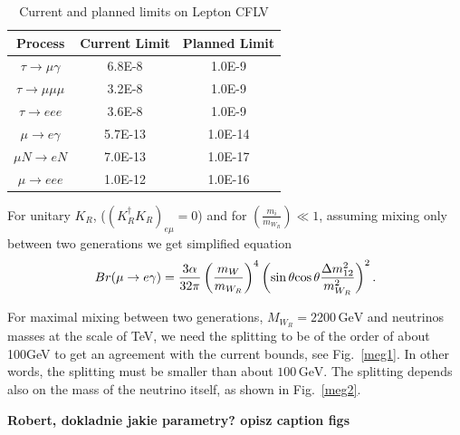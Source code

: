 \documentclass[twocolumn,superscriptaddress,showpacs,prl,nofootinbib,floatfix]{revtex4}
\begin{document}
\begin{table}[h!]
\noindent \begin{centering}
\begin{tabular}{|c|c|c|}
\hline 
Process & Current Limit & Planned Limit\tabularnewline
\hline 
\hline 
$\tau\rightarrow\mu\gamma$ & 6.8E-8 & 1.0E-9\tabularnewline
\hline 
$\tau\rightarrow\mu\mu\mu$ & 3.2E-8 & 1.0E-9\tabularnewline
\hline 
$\tau\rightarrow eee$ & 3.6E-8 & 1.0E-9\tabularnewline
\hline 
$\mu\rightarrow e\gamma$ & 5.7E-13 & 1.0E-14\tabularnewline
\hline 
$\mu N\rightarrow eN$ & 7.0E-13 & 1.0E-17\tabularnewline
\hline 
$\mu\rightarrow eee$ & 1.0E-12 & 1.0E-16\tabularnewline
\hline 
\end{tabular}
\par\end{centering}

\caption{Current and planned limits on Lepton CFLV}
\end{table}

For unitary $K_{R}$, ($\left(K_{R}^{\dagger}K_{R}\right)_{e\mu}=0$)
and for $\left(\frac{m_{i}}{m_{W_{R}}}\right)\ll1$, assuming mixing
only between two generations we get simplified equation
\begin{equation}
Br(\mu\rightarrow e\gamma)=\frac{3\alpha}{32\pi}\left(\frac{m_{W}}{m_{W_{R}}}\right)^{4}\left(\sin\theta\mbox{\ensuremath{\cos\theta}}\frac{\Delta m_{12}^{2}}{m_{W_{R}}^{2}}\right)^{2}.\label{eq:mu2egamma}
\end{equation}

For maximal mixing between two generations, $M_{W_{R}}=2200\,\mathrm{GeV}$
and neutrinos masses at the scale of TeV, we need the splitting to
be of the order of about 100GeV to get an agreement with the current
bounds, see Fig.~\ref{meg1}. In other words, the splitting must be smaller than about $100\,\mathrm{GeV}$.
The splitting depends also on the mass of the neutrino itself, as shown in Fig.~\ref{meg2}.

  {\bf Robert, dokladnie jakie parametry? opisz caption figs}
  
\end{document}
